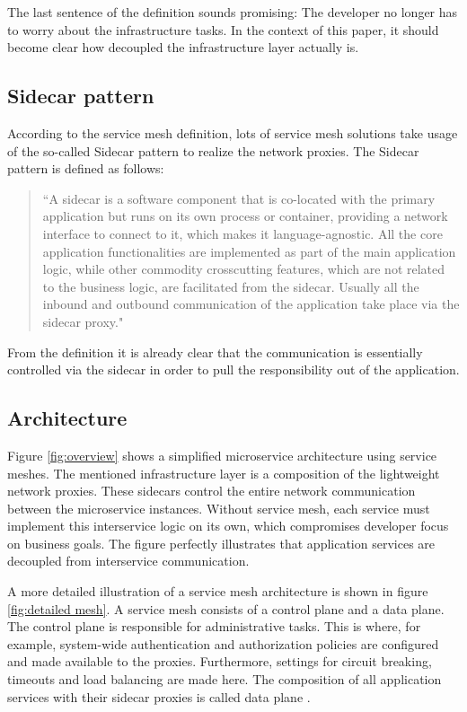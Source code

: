 The last sentence of the definition sounds promising: The developer no longer has to worry about the infrastructure tasks. In the context of this paper, it should become clear how decoupled the infrastructure layer actually is.

\subsection{Sidecar pattern}

According to the service mesh definition, lots of service mesh solutions take usage of the so-called Sidecar pattern to realize the network proxies. The Sidecar pattern is defined as follows:

\begin{quote}
``A sidecar is a software component that is co-located with 
the primary application but runs on its own process or container, providing 
a network interface to connect to it, which makes it language-agnostic. All 
the core application functionalities are implemented as part of the main 
application logic, while other commodity crosscutting features, which are not related to the business logic, are facilitated from the sidecar. Usually all the inbound and outbound communication of the application take place via the sidecar proxy." \cite[p. 266]{sm3}
\end{quote}

From the definition it is already clear that the communication is essentially controlled via the sidecar in order to pull the responsibility out of the application.

\subsection{Architecture}
\label{chap:mesh-architecture}

Figure \ref{fig:overview} shows a simplified microservice architecture using service meshes. The mentioned infrastructure layer is a composition of the lightweight network proxies. These sidecars control the entire network communication between the microservice instances. Without service mesh, each service must implement this interservice logic on its own, which compromises developer focus on business goals. The figure perfectly illustrates that application services are decoupled from interservice communication.

A more detailed illustration of a service mesh architecture is shown in figure \ref{fig:detailed mesh}. A service mesh consists of a control plane and a data plane.
The control plane is responsible for administrative tasks. This is where, for example, system-wide authentication and authorization policies are configured and made available to the proxies. Furthermore, settings for circuit breaking, timeouts and load balancing are made here. The composition of all application services with their sidecar proxies is called data plane \cite{sm4}.

